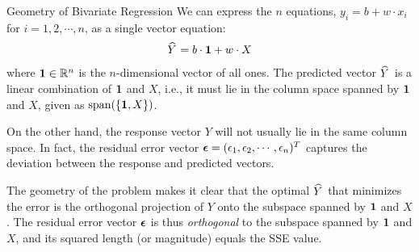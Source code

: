 \begin{frame}{Geometry of Bivariate Regression}
We can express the $n$
equations, $y_i = b + w \cdot x_i$ for $i=1,2,\cdots,n$, as a single vector equation:
\begin{align}
    \mkern 1.5mu\widehat{\mkern-1.5muY}\mkern 1.5mu = b \cdot \mathbf{1} + w \cdot X
    \label{eq:reg:linear:hY}
\end{align}
where $\mathbf{1} \in {\mathord{\mathbb R}}^n$ is the $n$-dimensional vector of all ones.
The predicted vector $\mkern 1.5mu\widehat{\mkern-1.5muY}\mkern 1.5mu$ is a
linear combination of $\mathbf{1}$ and $X$, i.e., it must lie in the column
space spanned by $\mathbf{1}$ and $X$, given as $\operatorname{span}(\{\mathbf{1}, X\})$.

\medskip

On the other hand, the response vector $Y$ will not usually lie in the
same column space. 
In fact, the residual error vector ${\bm \epsilon} = (\epsilon_1,
\epsilon_2, \cdots, \epsilon_n)^T$ captures the deviation between the
response and predicted vectors.

\medskip

The geometry of the problem %
makes it clear that the optimal $\mkern 1.5mu\widehat{\mkern-1.5muY}\mkern 1.5mu$ that minimizes the error is 
the orthogonal projection of
$Y$ onto the subspace spanned by $\mathbf{1}$ and $X$.
The residual error vector ${\bm \epsilon}$ is thus {\em orthogonal} to the subspace spanned by $\mathbf{1}$
and $X$, and its squared length (or magnitude) equals the SSE value.
\end{frame}
